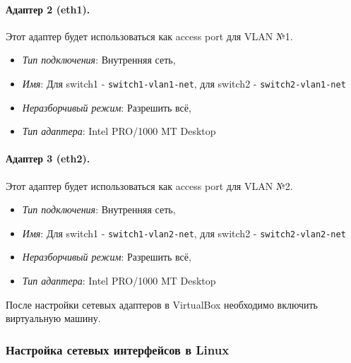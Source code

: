 \documentclass{article}
\begin{document}
\paragraph{Адаптер 2 (eth1).} Этот адаптер будет использоваться как access port для VLAN №1.
\begin{itemize}
    \itemsep0em 
    \item \emph{Тип подключения}: Внутренняя сеть,
    \item \emph{Имя}: Для switch1 - \verb|switch1-vlan1-net|, для switch2 - \verb|switch2-vlan1-net|
    \item \emph{Неразборчивый режим}: Разрешить всё, 
    \item \emph{Тип адаптера}: Intel PRO/1000 MT Desktop
\end{itemize} 
\paragraph{Адаптер 3 (eth2).} Этот адаптер будет использоваться как access port для VLAN №2.
\begin{itemize}
    \itemsep0em 
    \item \emph{Тип подключения}: Внутренняя сеть,
    \item \emph{Имя}: Для switch1 - \verb|switch1-vlan2-net|, для switch2 - \verb|switch2-vlan2-net|
    \item \emph{Неразборчивый режим}: Разрешить всё, 
    \item \emph{Тип адаптера}: Intel PRO/1000 MT Desktop
\end{itemize}

После настройки сетевых адаптеров в VirtualBox необходимо включить виртуальную машину. 

\subsubsection{Настройка сетевых интерфейсов в Linux}
\end{document}

